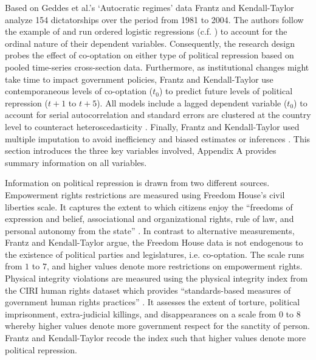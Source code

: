 Based on Geddes et al.'s \citeyearpar{Geddes.2014}
`Autocratic regimes' data Frantz and Kendall-Taylor
analyze 154 dictatorships over the period from 1981 to 2004.
The authors follow the example of \citet{Vreeland.2008} and
run ordered logistic regressions 
(c.f. \cite{Fox.2008,Fox.2011}) to account for the ordinal 
nature of their dependent variables. Consequently, the
research design probes the effect of co-optation on either 
type of political repression based on pooled time-series 
cross-section data. Furthermore, as institutional changes 
might take time to impact government policies, Frantz and 
Kendall-Taylor use contemporaneous levels of 
co-optation ($t_0$) to predict future levels of political 
repression ($t+1$ to $t+5$). All models include a lagged 
dependent variable ($t_0$) to account for serial 
autocorrelation and standard errors are clustered at 
the country level to counteract heteroscedasticity 
\citep{Beck.1995}. Finally, Frantz and Kendall-Taylor used
multiple imputation to avoid inefficiency and biased 
estimates or inferences 
\citep{King.2001b,Honaker.2010,Honaker.2011}. This section
introduces the three key variables involved, Appendix A 
provides summary information on all variables.

Information on political repression is drawn from two 
different sources. Empowerment rights restrictions are 
measured using Freedom House's civil liberties scale. It 
captures the extent to which citizens enjoy the ``freedoms 
of expression and belief, associational and organizational 
rights, rule of law, and personal autonomy from the state'' 
\citep{FreedomHouse.2010}. In contrast to alternative 
measurements, Frantz and Kendall-Taylor argue, the Freedom 
House data is not endogenous to the existence of political 
parties and legislatures, i.e. co-optation. The scale runs 
from $1$ to $7$, and higher values denote more restrictions 
on empowerment rights. Physical integrity violations are 
measured using the physical integrity index from the CIRI 
human rights dataset which provides ``standards-based 
measures of government human rights practices'' 
\citep[402]{Cingranelli.2010b}. It assesses the extent of 
torture, political imprisonment, extra-judicial killings, 
and disappearances on a scale from $0$ to $8$ whereby higher
values denote more government respect for the sanctity of 
person. Frantz and Kendall-Taylor recode the index such that
higher values denote more political repression.

